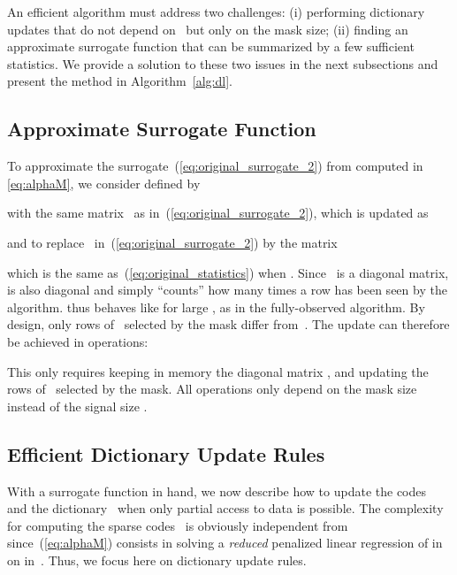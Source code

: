 \documentclass{article}
\begin{document}
An efficient algorithm must address two challenges: (i) performing
dictionary updates that do not depend on~ but only on the mask size;
(ii) finding an approximate surrogate function that can be summarized by a few
sufficient statistics.
We provide a solution to these two issues in the next subsections and present
the method in Algorithm~\ref{alg:dl}.















\subsection{Approximate Surrogate Function}
To approximate the surrogate~(\ref{eq:original_surrogate_2}) from  computed in \eqref{eq:alphaM},
we consider  defined by

with the same matrix~ as in~(\ref{eq:original_surrogate_2}), which is updated as

and to replace~ in~(\ref{eq:original_surrogate_2}) by the matrix

which is the same as~(\ref{eq:original_statistics}) when .
Since~ is a diagonal matrix,  is also diagonal and simply ``counts'' how
many times a row has been seen by the algorithm.  thus behaves like  for large , as in the fully-observed algorithm. By design, only rows of~ selected by the mask differ from~. The update can therefore be achieved in  operations:

This only requires keeping in memory the diagonal matrix ,
and updating the rows of~ selected by the mask.  All operations only
depend on the mask size  instead of the signal size .


\subsection{Efficient Dictionary Update Rules}

With a surrogate function in hand, we now describe how to update the
codes~ and the dictionary~ when only partial access to data is
possible.
The complexity for computing the sparse codes~ is obviously
independent from~ since~(\ref{eq:alphaM}) consists in
solving a \textit{reduced} penalized linear regression of  in~ on  in~.
Thus, we focus here on dictionary update rules.
\end{document}
